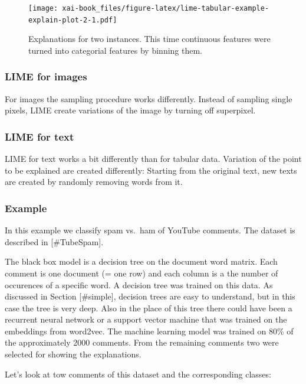 \documentclass[12pt,]{krantz}
\theoremstyle{definition}
\theoremstyle{definition}
\theoremstyle{definition}
\theoremstyle{remark}
\begin{document}
\begin{figure}
\centering
\texttt{[image: xai-book\_files/figure-latex/lime-tabular-example-explain-plot-2-1.pdf]}
\caption{\label{fig:lime-tabular-example-explain-plot-2}Explanations for two
instances. This time continuous features were turned into categorial
features by binning them.}
\end{figure}

\subsubsection{LIME for images}\label{lime-for-images}

For images the sampling procedure works differently. Instead of sampling
single pixels, LIME create variations of the image by turning off
superpixel.

\subsubsection{LIME for text}\label{lime-for-text}

LIME for text works a bit differently than for tabular data. Variation
of the point to be explained are created differently: Starting from the
original text, new texts are created by randomly removing words from it.

\subsubsection{Example}\label{example-4}

In this example we classify spam vs.~ham of YouTube comments. The
dataset is described in {[}\#TubeSpam{]}.

The black box model is a decision tree on the document word matrix. Each
comment is one document (= one row) and each column is a the number of
occurences of a specific word. A decision tree was trained on this data.
As discussed in Section {[}\#simple{]}, decision trees are easy to
understand, but in this case the tree is very deep. Also in the place of
this tree there could have been a recurrent neural network or a support
vector machine that was trained on the embeddings from word2vec. The
machine learning model was trained on 80\% of the approximately 2000
comments. From the remaining comments two were selected for showing the
explanations.

Let's look at tow comments of this dataset and the corresponding
classes:

\hypertarget{htmlwidget-94285ba5c6903b17154e}{}
\end{document}
